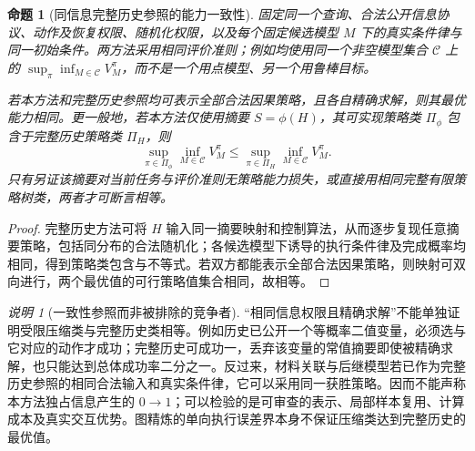 \documentclass[11pt,a4paper,fontset=fandol]{ctexart}
\newtheorem{proposition}[theorem]{命题}
\theoremstyle{definition}
\theoremstyle{remark}\newtheorem{remark}[theorem]{说明}
\numberwithin{equation}{section}
\begin{document}
\begin{proposition}[同信息完整历史参照的能力一致性]
\label{prop:history_reference_equality}
固定同一个查询、合法公开信息协议、动作及恢复权限、随机化权限，以及每个固定候选模型 $M$ 下的真实条件律与同一初始条件。两方法采用相同评价准则；例如均使用同一个非空模型集合 $\mathcal C$ 上的 $\sup_\pi\inf_{M\in\mathcal C}V_M^\pi$，而不是一个用点模型、另一个用鲁棒目标。

若本方法和完整历史参照均可表示全部合法因果策略，且各自精确求解，则其最优能力相同。更一般地，若本方法仅使用摘要 $S=\phi(H)$，其可实现策略类 $\Pi_\phi$ 包含于完整历史策略类 $\Pi_H$，则
\[
 \sup_{\pi\in\Pi_\phi}\inf_{M\in\mathcal C}V_M^\pi
 \le
 \sup_{\pi\in\Pi_H}\inf_{M\in\mathcal C}V_M^\pi.
\]
只有另证该摘要对当前任务与评价准则无策略能力损失，或直接用相同完整有限策略树类，两者才可断言相等。
\end{proposition}
\begin{proof}
完整历史方法可将 $H$ 输入同一摘要映射和控制算法，从而逐步复现任意摘要策略，包括同分布的合法随机化；各候选模型下诱导的执行条件律及完成概率均相同，得到策略类包含与不等式。若双方都能表示全部合法因果策略，则映射可双向进行，两个最优值的可行策略值集合相同，故相等。
\end{proof}

\begin{remark}[一致性参照而非被排除的竞争者]
“相同信息权限且精确求解”不能单独证明受限压缩类与完整历史类相等。例如历史已公开一个等概率二值变量，必须选与它对应的动作才成功；完整历史可成功一，丢弃该变量的常值摘要即使被精确求解，也只能达到总体成功率二分之一。反过来，材料关联与后继模型若已作为完整历史参照的相同合法输入和真实条件律，它可以采用同一获胜策略。因而不能声称本方法独占信息产生的 $0\!\to\!1$；可以检验的是可审查的表示、局部样本复用、计算成本及真实交互优势。图精炼的单向执行误差界本身不保证压缩类达到完整历史的最优值。
\end{remark}
\end{document}
